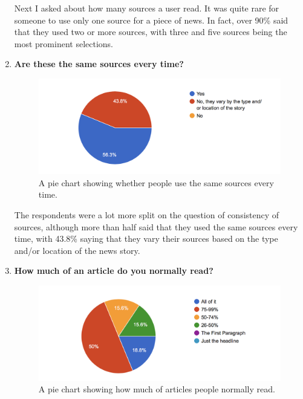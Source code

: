 \documentclass[12pt]{article}
\begin{document}
\begin{enumerate}
Next I asked about how many sources a user read. It was quite rare for someone to use only one source for a piece of news. In fact, over 90\% said that they used two or more sources, with three and five sources being the most prominent selections. \\

\item \textbf{Are these the same sources every time?}

\begin{figure}[ht!]
  \centering
    \includegraphics[scale=0.7]{03AreTheseTheSameSourcesEverytime}
   \caption[Survey Graph about consistency of sources]{A pie chart showing whether people use the same sources every time.}
   \label{SurveySourceConsistency}
\end{figure}

The respondents were a lot more split on the question of consistency of sources, although more than half said that they used the same sources every time, with 43.8\% saying that they vary their sources based on the type and/or location of the news story. \\

\item \textbf{How much of an article do you normally read?}

\begin{figure}[ht!]
  \centering
    \includegraphics[scale=0.7]{05HowMuchOfAnArticleDoYouRead.png}
   \caption[Survey Graph regarding how much of an article is read]{A pie chart showing how much of articles people normally read.}
   \label{SurveyArticleLength}
\end{figure}


\end{enumerate}
\end{document}
